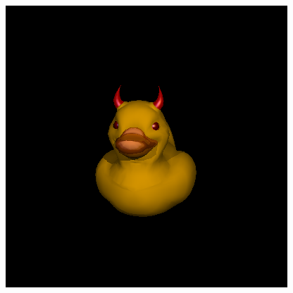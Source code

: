 \documentclass{beamer}
\begin{document}
\begin{frame}
\begin{columns}[T]
\begin{column}{.45\textwidth}
\begin{figure}
				\includegraphics[width=\textwidth]{devilduk}
			\end{figure}
		\end{column}
	\end{columns}
\end{frame}
\end{document}
